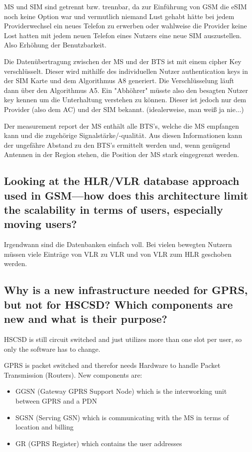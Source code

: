 MS und SIM sind getrennt bzw. trennbar, da zur Einführung von GSM die eSIM noch keine Option war und vermutlich niemand Lust gehabt hätte bei jedem Providerwechsel ein neues Telefon zu erwerben oder wahlweise die Provider keine Lost hatten mit jedem neuen Telefon eines Nutzers eine neue SIM auszustellen. Also Erhöhung der Benutzbarkeit.


Die Datenübertragung zwischen der MS und der BTS ist mit einem cipher Key verschlüsselt. Dieser wird mithilfe des individuellen Nutzer authentication keys in der SIM Karte und dem Algorithmus A8 generiert. Die Verschlüsselung läuft dann über den Algorithmus A5. Ein "Abhöhrer" müsste also den besagten Nutzer key kennen um die Unterhaltung verstehen zu können. Dieser ist jedoch nur dem Provider (also dem AC) und der SIM bekannt. (idealerweise, man weiß ja nie...)

Der measurement report der MS enthält alle BTS's, welche die MS empfangen kann und die zugehörige Signalstärke/-qualität. Aus diesen Informationen kann der ungefähre Abstand zu den BTS's ermittelt werden und, wenn genügend Antennen in der Region stehen, die Position der MS stark eingegrenzt werden.



\subsection{Looking at the HLR/VLR database approach used in GSM—how does this architecture limit the scalability in terms of users, especially moving users?}

Irgendwann sind die Datenbanken einfach voll. 
Bei vielen bewegten Nutzern müssen viele Einträge von VLR zu VLR und von VLR zum HLR geschoben werden.

\subsection{Why is a new infrastructure needed for GPRS, but not for HSCSD? Which components are new and what is their purpose?}

HSCSD is still circuit switched and just utilizes more than one slot per user, so only the software has to change. 

GPRS is packet switched and therefor needs Hardware to handle Packet Transmission (Routers).
New components are:
\begin{itemize}

\item GGSN (Gateway GPRS Support Node) which is the interworking unit between GPRS and a PDN

\item SGSN (Serving GSN) which is communicating with the MS in terms of location and billing

\item GR (GPRS Register) which contains the user addresses
\end{itemize}

